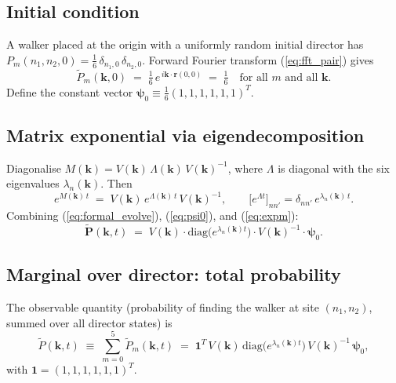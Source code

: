 \documentclass[11pt,a4paper]{article}
\newcommand{\vk}{\mathbf{k}}
\newcommand{\vr}{\mathbf{r}}
\newcommand{\Ptilde}{\widetilde{P}}
\begin{document}
\subsection{Initial condition}\label{ssec:ic}

A walker placed at the origin with a uniformly random initial director
has $P_m(n_1, n_2, 0) = \tfrac{1}{6}\, \delta_{n_1, 0}\, \delta_{n_2, 0}$.
Forward Fourier transform (\ref{eq:fft_pair}) gives
\begin{equation}\label{eq:psi0}
\Ptilde_m(\vk, 0) \;=\; \tfrac{1}{6}\, e^{\,i\vk\cdot\vr(0,0)} \;=\; \tfrac{1}{6} \quad \text{for all } m \text{ and all } \vk.
\end{equation}
Define the constant vector $\bm{\psi}_0 \equiv \tfrac{1}{6}(1, 1, 1, 1, 1, 1)^{T}$.

\subsection{Matrix exponential via eigendecomposition}\label{ssec:expm}

Diagonalise $M(\vk) = V(\vk)\, \Lambda(\vk)\, V(\vk)^{-1}$, where $\Lambda$
is diagonal with the six eigenvalues $\lambda_n(\vk)$. Then
\begin{equation}\label{eq:expm}
e^{M(\vk)\, t} \;=\; V(\vk)\, e^{\Lambda(\vk)\, t}\, V(\vk)^{-1},
\qquad \big[e^{\Lambda t}\big]_{nn'} = \delta_{nn'}\, e^{\lambda_n(\vk)\, t}.
\end{equation}
Combining (\ref{eq:formal_evolve}), (\ref{eq:psi0}), and (\ref{eq:expm}):
\begin{equation}\label{eq:ptilde_explicit}
\bm{\Ptilde}(\vk, t) \;=\; V(\vk) \cdot \mathrm{diag}\!\big(e^{\lambda_n(\vk) t}\big) \cdot V(\vk)^{-1} \cdot \bm{\psi}_0.
\end{equation}

\subsection{Marginal over director: total probability}\label{ssec:marginal}

The observable quantity (probability of finding the walker at site
$(n_1, n_2)$, summed over all director states) is
\begin{equation}\label{eq:Ptilde_total}
\Ptilde(\vk, t) \;\equiv\; \sum_{m=0}^{5} \Ptilde_m(\vk, t)
\;=\; \mathbf{1}^{T}\, V(\vk)\, \mathrm{diag}\!\big(e^{\lambda_n(\vk) t}\big)\, V(\vk)^{-1}\, \bm{\psi}_0,
\end{equation}
with $\mathbf{1} = (1, 1, 1, 1, 1, 1)^{T}$.
\end{document}
